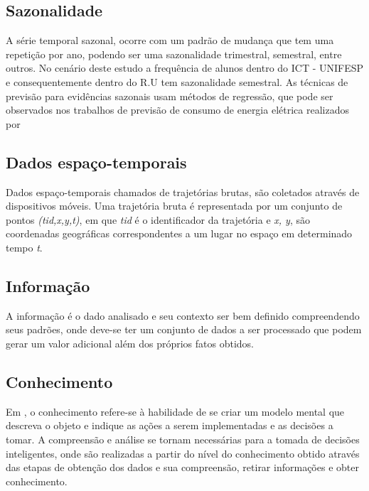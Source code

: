 \documentclass[	12pt, Times, openright, twoside, a4paper, english, brazil]{abntex2}
\begin{document}
\subsection{Sazonalidade}
A série temporal sazonal, ocorre com um padrão de mudança que  tem uma repetição por ano, podendo ser uma sazonalidade trimestral, semestral, entre outros. No cenário deste estudo a frequência de alunos dentro do ICT - UNIFESP e consequentemente dentro do R.U tem sazonalidade semestral. As técnicas de previsão para evidências sazonais usam métodos de regressão, que pode ser observados nos trabalhos de previsão de consumo de energia elétrica realizados por \cite{}

\subsection{Dados espaço-temporais}
Dados espaço-temporais chamados de trajetórias brutas, são coletados através de dispositivos móveis. Uma trajetória bruta é representada por um conjunto de pontos \textit{(tid,x,y,t)}, em que \textit{tid} é o identificador da trajetória e \textit{x, y}, são coordenadas geográficas correspondentes a um lugar no espaço em determinado tempo \textit{t}.

\subsection{Informação}
A informação é o dado analisado e seu contexto ser bem definido compreendendo seus padrões, onde deve-se ter um conjunto de dados a ser processado que podem gerar um valor adicional além dos próprios fatos obtidos.

\subsection{Conhecimento}
Em \cite{Rezende2003}, o conhecimento refere-se à habilidade de se criar um modelo mental que descreva o objeto e indique as ações a serem implementadas e as decisões a tomar. A compreensão e análise se tornam necessárias para a tomada de decisões inteligentes, onde são realizadas a partir do nível do conhecimento obtido através das etapas de obtenção dos dados e sua compreensão, retirar informações e obter conhecimento.\\
\end{document}
